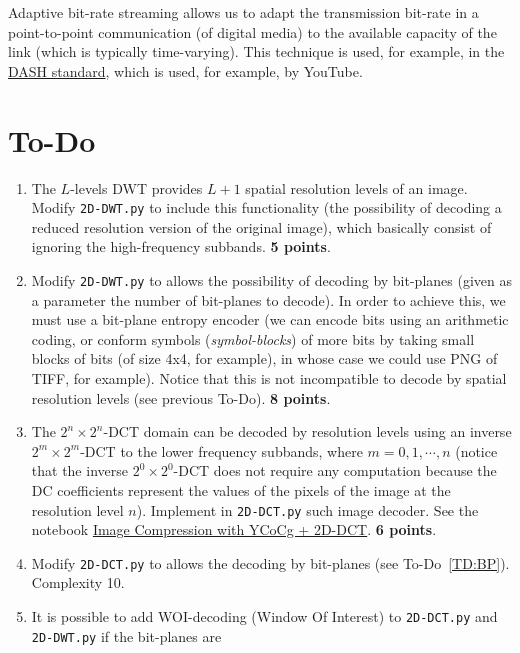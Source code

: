 Adaptive bit-rate streaming allows us to adapt the transmission bit-rate
in a point-to-point communication (of digital media) to the available
capacity of the link (which is typically time-varying). This
technique is used, for example, in the
\href{https://en.wikipedia.org/wiki/Dynamic_Adaptive_Streaming_over_HTTP}{DASH
  standard}, which is used, for example, by YouTube.


\section{To-Do}
\begin{enumerate}
\item The $L$-levels DWT provides $L+1$ spatial resolution levels of
  an image. Modify \texttt{2D-DWT.py} to include this functionality
  (the possibility of decoding a reduced resolution version of the
  original image), which basically consist of ignoring the
  high-frequency subbands. \textbf{5 points}.
\item \label{TD:BP} Modify \texttt{2D-DWT.py} to allows the
  possibility of decoding by bit-planes (given as a parameter the
  number of bit-planes to decode). In order to achieve this, we must
  use a bit-plane entropy encoder (we can encode bits using an
  arithmetic coding, or conform symbols (\emph{symbol-blocks}) of more
  bits by taking small blocks of bits (of size 4x4, for example), in
  whose case we could use PNG of TIFF, for example). Notice that this is not
  incompatible to decode by spatial resolution levels (see previous
  To-Do). \textbf{8 points}.
\item The $2^n\times 2^n$-DCT domain can be decoded by resolution
  levels using an inverse $2^m\times 2^m$-DCT to the lower frequency
  subbands, where $m=0,1,\cdots,n$ (notice that the inverse
  $2^0\times 2^0$-DCT does not require any computation because the DC
  coefficients represent the values of the pixels of the image at the
  resolution level $n$). Implement in \texttt{2D-DCT.py} such image
  decoder. See the notebook
  \href{https://github.com/vicente-gonzalez-ruiz/DCT2D/blob/master/src/DCT2D/YCoCg_2D_DCT_SQ.ipynb}{Image
    Compression with YCoCg + 2D-DCT}. \textbf{6 points}.
\item Modify \texttt{2D-DCT.py} to allows the decoding by bit-planes
  (see To-Do~\ref{TD:BP}). Complexity 10.
\item It is possible to add WOI-decoding (Window Of Interest) to
  \texttt{2D-DCT.py} and \texttt{2D-DWT.py} if the bit-planes are

\end{enumerate}
